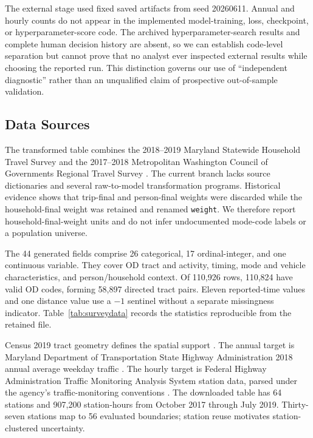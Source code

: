 \documentclass[numbered]{trbunofficial}
\begin{document}
The external stage used fixed saved artifacts from seed 20260611. Annual and hourly counts do not appear in the implemented model-training, loss, checkpoint, or hyperparameter-score code. The archived hyperparameter-search results and complete human decision history are absent, so we can establish code-level separation but cannot prove that no analyst ever inspected external results while choosing the reported run. This distinction governs our use of ``independent diagnostic'' rather than an unqualified claim of prospective out-of-sample validation.

\subsection{Data Sources}

The transformed table combines the 2018--2019 Maryland Statewide Household Travel Survey and the 2017--2018 Metropolitan Washington Council of Governments Regional Travel Survey \citep{bmc2020mts,mwcog2019rts}. The current branch lacks source dictionaries and several raw-to-model transformation programs. Historical evidence shows that trip-final and person-final weights were discarded while the household-final weight was retained and renamed \texttt{weight}. We therefore report household-final-weight units and do not infer undocumented mode-code labels or a population universe.

The 44 generated fields comprise 26 categorical, 17 ordinal-integer, and one continuous variable. They cover OD tract and activity, timing, mode and vehicle characteristics, and person/household context. Of 110,926 rows, 110,824 have valid OD codes, forming 58,897 directed tract pairs. Eleven reported-time values and one distance value use a $-1$ sentinel without a separate missingness indicator. Table~\ref{tab:surveydata} records the statistics reproducible from the retained file.



Census 2019 tract geometry defines the spatial support \citep{census2019tiger}. The annual target is Maryland Department of Transportation State Highway Administration 2018 annual average weekday traffic \citep{mdot2018aawdt}. The hourly target is Federal Highway Administration Traffic Monitoring Analysis System station data, parsed under the agency's traffic-monitoring conventions \citep{fhwa2018tmas,fhwa2022tmg}. The downloaded table has 64 stations and 907,200 station-hours from October 2017 through July 2019. Thirty-seven stations map to 56 evaluated boundaries; station reuse motivates station-clustered uncertainty.
\end{document}
